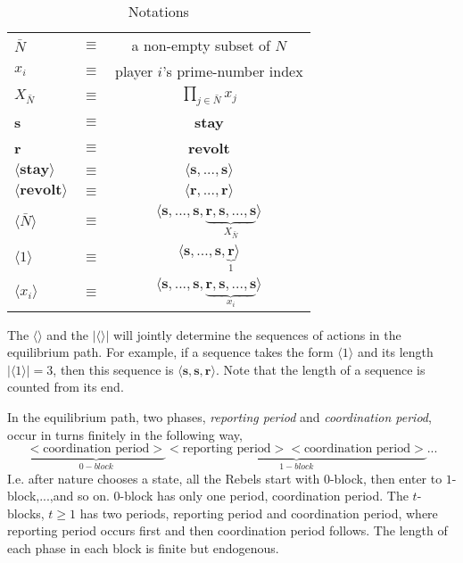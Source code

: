 \documentclass[12pt,letter]{article}
\theoremstyle{definition}
\theoremstyle{remark}
\theoremstyle{claim}
\begin{document}
\begin{table}[t]
\caption{Notations}
\label{Table_msg_form}
\begin{center}
\begin{tabular}{l c c}
$\bar{N}$ 										& $\equiv$ 			& a non-empty subset of $N$  \\
$x_i$ 											& $\equiv$ 			& player $i$'s prime-number index  \\
$X_{\bar{N}}$ 								& $\equiv$ 			& $\prod_{j\in \bar{N}}x_j$  \\
\textbf{s}										& $\equiv$ 			& \textbf{stay}  \\
\textbf{r}										& $\equiv$ 			& \textbf{revolt}  \\
$\langle \textbf{stay} \rangle$ 		& $\equiv$ 			& $\langle \textbf{s},...,\textbf{s}\rangle$  \\
$\langle \textbf{revolt} \rangle$ 	& $\equiv$ 			& $\langle \textbf{r},...,\textbf{r}\rangle$  \\
$\langle  \bar{N} \rangle$ 				& $\equiv$ 			& $\langle \textbf{s},...,\textbf{s},\underbrace{\textbf{r},\textbf{s},...,\textbf{s}}_{X_{ \bar{N}}}\rangle$  \\

$\langle 1 \rangle$	 					& $\equiv$ 			& $\langle \textbf{s},...,\textbf{s},\underbrace{\textbf{r}}_{1}\rangle$  \\
$\langle x_i \rangle$	 	& $\equiv$ 			& $\langle \textbf{s},...,\textbf{s},\underbrace{\textbf{r},\textbf{s},...,\textbf{s}}_{x_i}\rangle$  \\
\end{tabular}
\end{center}
\end{table}

The $\langle\rangle$ and the $|\langle\rangle|$ will jointly determine the sequences of actions in the equilibrium path. For example, if a sequence takes the form $\langle 1 \rangle$ and its length $|\langle 1 \rangle|=3$, then this sequence is $\langle \textbf{s},\textbf{s},\textbf{r}\rangle$. Note that the length of a sequence is counted from its end.



In the equilibrium path, two phases, \textit{reporting period} and \textit{coordination period}, occur in turns finitely in the following way,
\[\underbrace{<\text{coordination period}>}_{0-block}\underbrace{<\text{reporting period}><\text{coordination period}>}_{1-block}...\]
I.e. after nature chooses a state, all the Rebels start with $0$-block, then enter to $1$-block,...,and so on. $0$-block has only one period, coordination period. The $t$-blocks, $t\geq 1$ has two periods, reporting period and coordination period, where reporting period occurs first and then coordination period follows. The length of each phase in each block is finite but endogenous.
\end{document}
